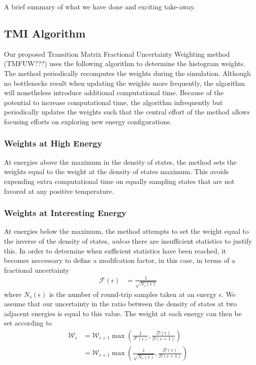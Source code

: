 \documentclass[letterpaper,twocolumn,amsmath,amssymb,pre,aps,10pt]{revtex4-1}
\begin{document}
A brief summary of what we have done and exciting take-away.


\subsection{TMI Algorithm}

Our proposed Transition Matrix Fractional Uncertainty Weighting  
method (TMFUW???) uses the following algorithm to determine the histogram weights.  
The method periodically recomputes the weights during the simulation.  Although 
no bottlenecks result when updating the weights more frequently, the
algorithm will nonetheless introduce additional computational time.  Because
of the potential to increase computational time, the algorithm
infrequently but periodically updates the weights such that the central
effort of the method allows focusing efforts on exploring new energy
configurations.

\subsubsection{Weights at High Energy}
At energies above the maximum in the density of states, the method sets the weights 
equal to the weight at the density of states maximum.  This avoids expending 
extra computational time on equally sampling states that are not favored at any 
positive temperature.

\subsubsection{Weights at Interesting Energy}
At energies below the maximum, the method attempts to set the weight equal to the 
inverse of the density of states, \emph{unless} there are insufficient statistics 
to justify this.  In order to determine when sufficient statistics have been reached,
it becomes neccessary to define a modifcation factor, in this case, in terms of a 
fractional uncertainty
\begin{align}
  \mathcal{F}(\epsilon) &= \frac{1}{\sqrt{N_s(\epsilon)}}
\end{align}
where $N_s(\epsilon)$ is the number of round-trip samples taken at an energy
$\epsilon$.  We assume that our uncertainty in the ratio between the density
of states at two adjacent energies is equal to this value.  The weight at each
energy can then be set according to
\begin{align}
  \mathcal{W}_{\epsilon} &= \mathcal{W}_{\epsilon+1}\max\left(\frac1{\mathcal{F}
  (\epsilon)},\frac{\mathcal{D}(\epsilon)}{\mathcal{D}(\epsilon+1)}\right)
  \\
   &= \mathcal{W}_{\epsilon+1}\max\left(\frac1{\sqrt{N_s(\epsilon)}},
  \frac{\mathcal{D}(\epsilon)}{\mathcal{D}(\epsilon+1)}\right)
\end{align}
\end{document}
